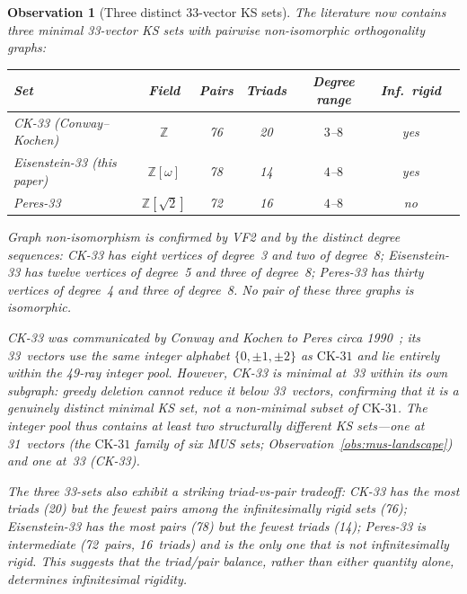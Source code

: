 \documentclass[12pt,a4paper]{article}
\newtheorem{observation}[theorem]{Observation}
\newcommand{\Z}{\mathbb{Z}}
\newcommand{\CK}{\mathrm{CK}\text{-}31}
\begin{document}
\begin{observation}[Three distinct 33-vector KS sets]\label{obs:three-33}
The literature now contains three minimal 33-vector KS sets with pairwise non-isomorphic orthogonality graphs:

\medskip
\begin{center}
\renewcommand{\arraystretch}{1.1}
\begin{tabular}{lcccccc}
\hline
Set & Field & Pairs & Triads & Degree range & Inf.\ rigid \\
\hline
CK-33 (Conway--Kochen) & $\Z$ & 76 & 20 & $3$--$8$ & yes \\
Eisenstein-33 (this paper) & $\Z[\omega]$ & 78 & 14 & $4$--$8$ & yes \\
Peres-33 & $\Z[\sqrt{2}]$ & 72 & 16 & $4$--$8$ & no \\
\hline
\end{tabular}
\end{center}
\medskip

Graph non-isomorphism is confirmed by VF2 and by the distinct degree sequences: CK-33 has eight vertices of degree~3 and two of degree~8; Eisenstein-33 has twelve vertices of degree~5 and three of degree~8; Peres-33 has thirty vertices of degree~4 and three of degree~8.  No pair of these three graphs is isomorphic.

CK-33 was communicated by Conway and Kochen to Peres circa 1990~\cite{Peres1991}; its 33~vectors use the same integer alphabet $\{0, \pm 1, \pm 2\}$ as $\CK$ and lie entirely within the 49-ray integer pool.  However, CK-33 is \emph{minimal at~33 within its own subgraph}: greedy deletion cannot reduce it below 33~vectors, confirming that it is a genuinely distinct minimal KS set, not a non-minimal subset of $\CK$.  The integer pool thus contains at least two structurally different KS sets---one at 31~vectors (the $\CK$ family of six MUS sets; Observation~\ref{obs:mus-landscape}) and one at~33 (CK-33).

The three 33-sets also exhibit a striking triad-vs-pair tradeoff: CK-33 has the most triads (20) but the fewest pairs among the infinitesimally rigid sets (76); Eisenstein-33 has the most pairs (78) but the fewest triads (14); Peres-33 is intermediate (72~pairs, 16~triads) and is the only one that is not infinitesimally rigid.  This suggests that the triad/pair balance, rather than either quantity alone, determines infinitesimal rigidity.
\end{observation}
\end{document}

